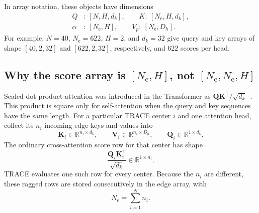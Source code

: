 \documentclass[aps,prx,preprint,notitlepage,superscriptaddress,nofootinbib,floatfix]{revtex4-2}
\newcommand{\vect}[1]{\bm{#1}}
\newif\ifshowrevisions
\newenvironment{draftthirtyoneblock}
  {\ifshowrevisions\color{draftthirtyonecolor}\fi}
  {}
\begin{document}
\begin{draftthirtyoneblock}
In array notation, these objects have dimensions
\begin{equation}
 \begin{split}
 Q&:\ [N,H,d_k],\qquad
 K:\ [N_{\mathrm e},H,d_k],\\
 \alpha&:\ [N_{\mathrm e},H],\qquad
 V_p:\ [N_{\mathrm e},D_h].
 \end{split}
 \label{eq:app-shapes}
\end{equation}
For example, \(N=40\), \(N_{\mathrm e}=622\), \(H=2\), and \(d_k=32\)
give query and key arrays of shape \([40,2,32]\) and \([622,2,32]\),
respectively, and 622 scores per head.

\subsection{Why the score array is \texorpdfstring{\([N_{\mathrm e},H]\)}
{[Ne,H]}, not \texorpdfstring{\([N_{\mathrm e},N_{\mathrm e},H]\)}
{[Ne,Ne,H]}}

Scaled dot-product attention was introduced in the Transformer as
\(\vect Q\vect K^{\mathsf T}/\sqrt{d_k}\)~\cite{vaswani2017}. This product is
square only for self-attention when the query and key sequences have the same
length. For a particular TRACE center \(i\) and one attention head, collect
its \(n_i\) incoming edge keys and values into
\begin{equation}
 \vect K_i\in\mathbb R^{n_i\times d_k},
 \qquad
 \vect V_i\in\mathbb R^{n_i\times D_h},
 \qquad
 \vect Q_i\in\mathbb R^{1\times d_k}.
 \label{eq:app-local-qkv}
\end{equation}
The ordinary cross-attention score row for that center has shape
\begin{equation}
 \frac{\vect Q_i\vect K_i^{\mathsf T}}{\sqrt{d_k}}
 \in\mathbb R^{1\times n_i}.
 \label{eq:app-local-score}
\end{equation}
TRACE evaluates one such row for every center. Because the \(n_i\) are
different, these ragged rows are stored consecutively in the edge array, with
\begin{equation}
 N_{\mathrm e}=\sum_{i=1}^{N}n_i .
 \label{eq:app-edge-count}
\end{equation}


\end{draftthirtyoneblock}
\end{document}

